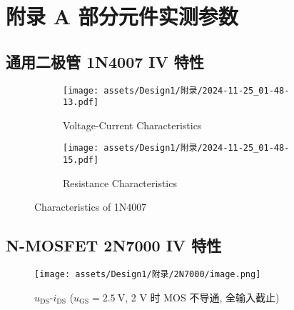 \documentclass[UTF8]{article}
\theoremstyle{MyLineTheoremStyle} %
\theoremstyle{MyBlockTheoremStyle} %
\theoremstyle{MySubsubsectionStyle} %
\begin{document}
\section*{附录 A\hspace*{20pt} 部分元件实测参数}
\thispagestyle{fancy}
\setcounter{section}{1} 
\setcounter{equation}{0}    %
\setcounter{subsection}{0}
\renewcommand\thesubsection{A.\arabic{subsection}}   
\renewcommand{\thefigure}{\arabic{figure}} 
\renewcommand{\thetable}{\arabic{table}}

\subsection{通用二极管 1N4007 IV 特性}
\begin{figure}[H]\centering
\begin{subfigure}[b]{\columnwidth}\centering
    \texttt{[image: assets/Design1/附录/2024-11-25\_01-48-13.pdf]}
    \caption{Voltage-Current Characteristics}
\end{subfigure}\hfill\vspace*{1cm}
\begin{subfigure}[b]{\columnwidth}\centering
    \texttt{[image: assets/Design1/附录/2024-11-25\_01-48-15.pdf]}
    \caption{Resistance Characteristics}
\end{subfigure}
\caption{Characteristics of 1N4007}
\end{figure}

\subsection{N-MOSFET 2N7000 IV 特性}
\begin{figure}[H]\centering
    \texttt{[image: assets/Design1/附录/2N7000/image.png]}
    \caption{$u_{\text{DS}}$-$i_{\text{DS}}$ ($u_{\text{GS}} = 2.5 \ \mathrm{V}$, 2 V 时 MOS 不导通, 全输入截止)}
\end{figure}
\end{document}
